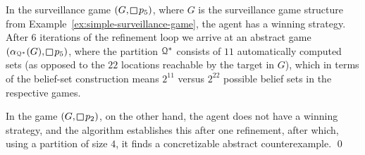 \begin{eg}\label{ex:simple-safety-realizability}
In the surveillance game $(G,\LTLglobally p_5)$, where $G$ is the surveillance game structure from Example~\ref{ex:simple-surveillance-game}, the agent has a winning strategy. After $6$ iterations of the refinement loop we arrive at an abstract game $(\alpha_{\partition^*}(G),\LTLglobally p_5)$, where the partition $\mathcal{Q}^*$ consists of $11$ automatically computed sets (as opposed to the $22$ locations reachable by the target in $G$), which in terms of the belief-set construction means $2^{11}$ versus $2^{22}$ possible belief sets in the respective games.

In the game $(G,\LTLglobally p_2)$, on the other hand, the agent does not have a winning strategy, and the algorithm establishes this after one refinement, after which, using a partition of size $4$,  it finds a concretizable abstract counterexample.
\qed
\end{eg}